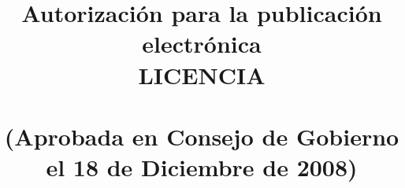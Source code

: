 % 
% 
% 
% 
% 
% 
% 
% 


% 



% 

\title{Autorización \wordAutorDelOrDeLa{} \wordAutorOrAutora{} para la publicación
  electrónica \\ LICENCIA\\~\\ \large(Aprobada en Consejo de Gobierno el 18 de Diciembre de 2008)} 
\date{}                                            %

